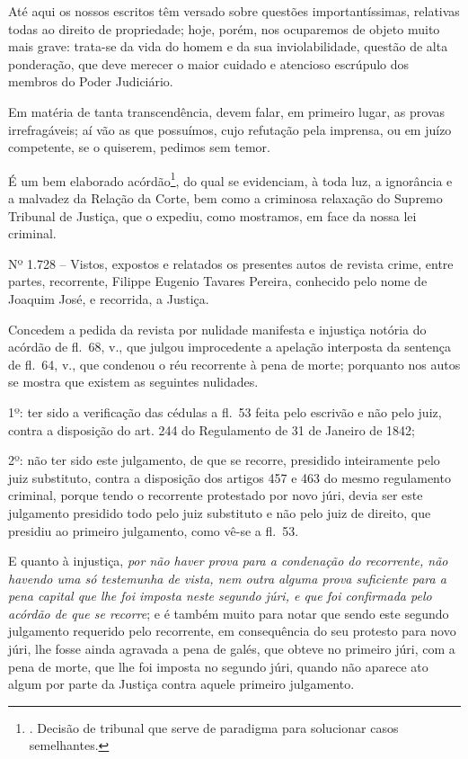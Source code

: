 Até aqui os nossos escritos têm versado sobre questões importantíssimas,
relativas todas ao direito de propriedade; hoje, porém, nos ocuparemos
de objeto muito mais grave: trata-se da vida do homem e da sua
inviolabilidade, questão de alta ponderação, que deve merecer o maior
cuidado e atencioso escrúpulo dos membros do Poder Judiciário.

Em matéria de tanta transcendência, devem falar, em primeiro lugar, as
provas irrefragáveis; aí vão as que possuímos, cujo refutação pela
imprensa, ou em juízo competente, se o quiserem, pedimos sem temor.

É um bem elaborado acórdão\footnote{. Decisão de tribunal que serve de
  paradigma para solucionar casos semelhantes.}, do qual se evidenciam,
à toda luz, a ignorância e a malvadez da Relação da Corte, bem como a
criminosa relaxação do Supremo Tribunal de Justiça, que o expediu, como
mostramos, em face da nossa lei criminal.

Nº 1.728 -- Vistos, expostos e relatados os presentes autos de revista
crime, entre partes, recorrente, Filippe Eugenio Tavares Pereira,
conhecido pelo nome de Joaquim José, e recorrida, a Justiça.

Concedem a pedida da revista por nulidade manifesta e injustiça notória
do acórdão de fl.~68, v., que julgou improcedente a apelação interposta
da sentença de fl.~64, v., que condenou o réu recorrente à pena de
morte; porquanto nos autos se mostra que existem as seguintes nulidades.

1º: ter sido a verificação das cédulas a fl.~53 feita pelo escrivão e
não pelo juiz, contra a disposição do art. 244 do Regulamento de 31 de
Janeiro de 1842;

2º: não ter sido este julgamento, de que se recorre, presidido
inteiramente pelo juiz substituto, contra a disposição dos artigos 457 e
463 do mesmo regulamento criminal, porque tendo o recorrente protestado
por novo júri, devia ser este julgamento presidido todo pelo juiz
substituto e não pelo juiz de direito, que presidiu ao primeiro
julgamento, como vê-se a fl.~53.

E quanto à injustiça, \emph{por não haver prova para a condenação do
recorrente, não havendo uma só testemunha de vista, nem outra alguma
prova suficiente para a pena capital que lhe foi imposta neste segundo
júri, e que foi confirmada pelo acórdão de que se recorre}; e é também
muito para notar que sendo este segundo julgamento requerido pelo
recorrente, em consequência do seu protesto para novo júri, lhe fosse
ainda agravada a pena de galés, que obteve no primeiro júri, com a pena
de morte, que lhe foi imposta no segundo júri, quando não aparece ato
algum por parte da Justiça contra aquele primeiro julgamento.

